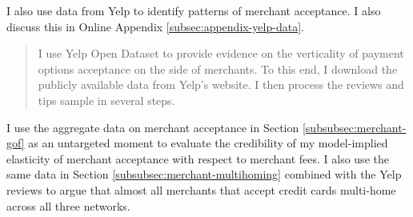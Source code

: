 \documentclass[main.tex]{subfiles}
\begin{document}
\begin{refsection}
%         

I also use data from Yelp to identify patterns of merchant acceptance.
I also discuss this in Online Appendix \ref{subsec:appendix-yelp-data}.

\begin{quote}
    I use Yelp Open Dataset to provide evidence on the verticality of payment options acceptance on the side of merchants.
To this end, I download the publicly available data from Yelp's website.
I then process the reviews and tips sample in several steps.
\end{quote}


I use the aggregate data on merchant acceptance in Section \ref{subsubsec:merchant-gof} as an untargeted moment to evaluate the credibility of my model-implied elasticity of merchant acceptance with respect to merchant fees.  I also use the same data in Section \ref{subsubsec:merchant-multihoming} combined with the Yelp reviews to argue that almost all merchants that accept credit cards multi-home across all three networks.




\end{refsection}
\end{document}
